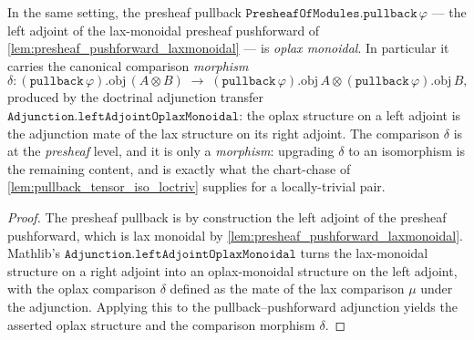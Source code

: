 \begin{lemma}\leanok
  \label{lem:presheaf_pullback_oplaxmonoidal}
  In the same setting, the presheaf pullback \(\mathtt{PresheafOfModules.pullback}\,\varphi\)
  --- the left adjoint of the lax-monoidal presheaf pushforward of
  \cref{lem:presheaf_pushforward_laxmonoidal} --- is \emph{oplax monoidal}. In
  particular it carries the canonical comparison \emph{morphism}
  \[
    \delta :
      (\mathtt{pullback}\,\varphi).\mathrm{obj}\,(A \otimes B)
      \;\longrightarrow\;
      (\mathtt{pullback}\,\varphi).\mathrm{obj}\,A
        \otimes (\mathtt{pullback}\,\varphi).\mathrm{obj}\,B,
  \]
  produced by the doctrinal adjunction transfer
  \(\mathtt{Adjunction.leftAdjointOplaxMonoidal}\): the oplax structure on a left
  adjoint is the adjunction mate of the lax structure on its right adjoint. The
  comparison \(\delta\) is at the \emph{presheaf} level, and it is only a
  \emph{morphism}: upgrading \(\delta\) to an isomorphism is the remaining content, and
  is exactly what the chart-chase of \cref{lem:pullback_tensor_iso_loctriv}
  supplies for a locally-trivial pair.
\end{lemma}

\begin{proof}
  \leanok
  The presheaf pullback is by construction the left adjoint of the presheaf pushforward,
  which is lax monoidal by \cref{lem:presheaf_pushforward_laxmonoidal}. Mathlib's
  \(\mathtt{Adjunction.leftAdjointOplaxMonoidal}\) turns the lax-monoidal structure on a
  right adjoint into an oplax-monoidal structure on the left adjoint, with the oplax
  comparison \(\delta\) defined as the mate of the lax comparison \(\mu\) under the
  adjunction. Applying this to the pullback--pushforward adjunction yields the asserted
  oplax structure and the comparison morphism \(\delta\).
\end{proof}


